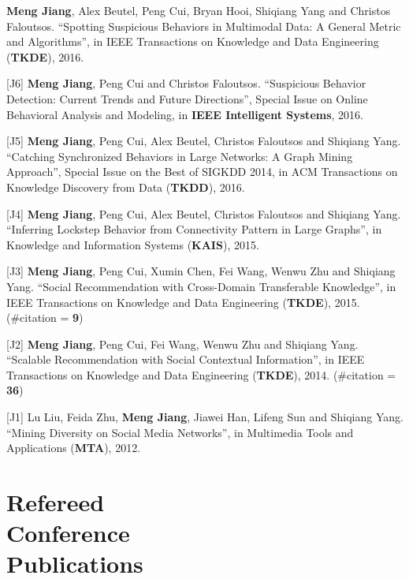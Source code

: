 \documentclass[margin, 10pt]{res}
\begin{document}
\begin{resume}
[J7] \textbf{Meng Jiang}, Alex Beutel, Peng Cui, Bryan Hooi, Shiqiang Yang and Christos Faloutsos. ``Spotting Suspicious Behaviors in Multimodal Data: A General Metric and Algorithms'', in IEEE Transactions on Knowledge and Data Engineering (\textbf{TKDE}), 2016. %

[J6] \textbf{Meng Jiang}, Peng Cui and Christos Faloutsos. ``Suspicious Behavior Detection: Current Trends and Future Directions'', Special Issue on Online Behavioral Analysis and Modeling, in \textbf{IEEE Intelligent Systems}, 2016. %

[J5] \textbf{Meng Jiang}, Peng Cui, Alex Beutel, Christos Faloutsos and Shiqiang Yang. ``Catching Synchronized Behaviors in Large Networks: A Graph Mining Approach'', Special Issue on the Best of SIGKDD 2014, in ACM Transactions on Knowledge Discovery from Data (\textbf{TKDD}), 2016. %

[J4] \textbf{Meng Jiang}, Peng Cui, Alex Beutel, Christos Faloutsos and Shiqiang Yang. ``Inferring Lockstep Behavior from Connectivity Pattern in Large Graphs'', in Knowledge and Information Systems (\textbf{KAIS}), 2015. %

[J3] \textbf{Meng Jiang}, Peng Cui, Xumin Chen, Fei Wang, Wenwu Zhu and Shiqiang Yang. ``Social Recommendation with Cross-Domain Transferable Knowledge'', in IEEE Transactions on Knowledge and Data Engineering (\textbf{TKDE}), 2015. (\#citation = \textbf{9}) %

[J2] \textbf{Meng Jiang}, Peng Cui, Fei Wang, Wenwu Zhu and Shiqiang Yang. ``Scalable Recommendation with Social Contextual Information'', in IEEE Transactions on Knowledge and Data Engineering (\textbf{TKDE}), 2014. (\#citation = \textbf{36}) %

[J1] Lu Liu, Feida Zhu, \textbf{Meng Jiang}, Jiawei Han, Lifeng Sun and Shiqiang Yang. ``Mining Diversity on Social Media Networks'', in Multimedia Tools and Applications (\textbf{MTA}), 2012. %


\section{Refereed \\ Conference \\ Publications}


\end{resume}
\end{document}
